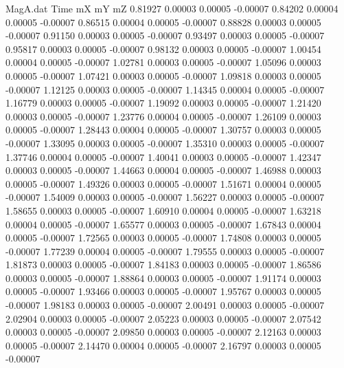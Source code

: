 \begin{filecontents}{MagA.dat}
Time mX mY mZ
   0.81927    0.00003    0.00005   -0.00007
   0.84202    0.00004    0.00005   -0.00007
   0.86515    0.00004    0.00005   -0.00007
   0.88828    0.00003    0.00005   -0.00007
   0.91150    0.00003    0.00005   -0.00007
   0.93497    0.00003    0.00005   -0.00007
   0.95817    0.00003    0.00005   -0.00007
   0.98132    0.00003    0.00005   -0.00007
   1.00454    0.00004    0.00005   -0.00007
   1.02781    0.00003    0.00005   -0.00007
   1.05096    0.00003    0.00005   -0.00007
   1.07421    0.00003    0.00005   -0.00007
   1.09818    0.00003    0.00005   -0.00007
   1.12125    0.00003    0.00005   -0.00007
   1.14345    0.00004    0.00005   -0.00007
   1.16779    0.00003    0.00005   -0.00007
   1.19092    0.00003    0.00005   -0.00007
   1.21420    0.00003    0.00005   -0.00007
   1.23776    0.00004    0.00005   -0.00007
   1.26109    0.00003    0.00005   -0.00007
   1.28443    0.00004    0.00005   -0.00007
   1.30757    0.00003    0.00005   -0.00007
   1.33095    0.00003    0.00005   -0.00007
   1.35310    0.00003    0.00005   -0.00007
   1.37746    0.00004    0.00005   -0.00007
   1.40041    0.00003    0.00005   -0.00007
   1.42347    0.00003    0.00005   -0.00007
   1.44663    0.00004    0.00005   -0.00007
   1.46988    0.00003    0.00005   -0.00007
   1.49326    0.00003    0.00005   -0.00007
   1.51671    0.00004    0.00005   -0.00007
   1.54009    0.00003    0.00005   -0.00007
   1.56227    0.00003    0.00005   -0.00007
   1.58655    0.00003    0.00005   -0.00007
   1.60910    0.00004    0.00005   -0.00007
   1.63218    0.00004    0.00005   -0.00007
   1.65577    0.00003    0.00005   -0.00007
   1.67843    0.00004    0.00005   -0.00007
   1.72565    0.00003    0.00005   -0.00007
   1.74808    0.00003    0.00005   -0.00007
   1.77239    0.00004    0.00005   -0.00007
   1.79555    0.00003    0.00005   -0.00007
   1.81873    0.00003    0.00005   -0.00007
   1.84183    0.00003    0.00005   -0.00007
   1.86586    0.00003    0.00005   -0.00007
   1.88864    0.00003    0.00005   -0.00007
   1.91174    0.00003    0.00005   -0.00007
   1.93466    0.00003    0.00005   -0.00007
   1.95767    0.00003    0.00005   -0.00007
   1.98183    0.00003    0.00005   -0.00007
   2.00491    0.00003    0.00005   -0.00007
   2.02904    0.00003    0.00005   -0.00007
   2.05223    0.00003    0.00005   -0.00007
   2.07542    0.00003    0.00005   -0.00007
   2.09850    0.00003    0.00005   -0.00007
   2.12163    0.00003    0.00005   -0.00007
   2.14470    0.00004    0.00005   -0.00007
   2.16797    0.00003    0.00005   -0.00007

\end{filecontents}
